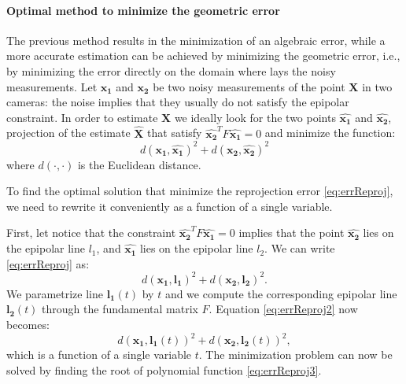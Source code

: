 \paragraph{Optimal method to minimize the geometric error}
The previous method results in the minimization of an algebraic error, while a more accurate estimation can be achieved by minimizing the geometric error, i.e., by minimizing the error directly on the domain where lays the noisy measurements.
Let $\mathbf{x_1}$ and $\mathbf{x_2}$ be two noisy measurements of the point $\mathbf{X}$ in two cameras: the noise implies that they usually do not satisfy the epipolar constraint. In order to estimate $\mathbf{X}$ we ideally look for the two points $\hat{\mathbf{x_1}}$ and $\hat{\mathbf{x_2}}$, projection of the estimate $\hat{\mathbf{X}}$ that satisfy $\hat{\mathbf{x_2}}^{T} F \hat{\mathbf{x_1}} = 0$ and  minimize the function:
\begin{equation}
\label{eq:errReproj}
  d(\mathbf{x_1}, \hat{\mathbf{x_1}})^2 + d(\mathbf{x_2}, \hat{\mathbf{x_2}})^2
\end{equation}
where $d(\cdot,\cdot)$ is the Euclidean distance. 

To find the optimal solution that minimize the reprojection error \eqref{eq:errReproj}, we need to rewrite it conveniently as a function of a single variable.

First, let notice that the constraint $\hat{\mathbf{x_2}}^{T} F \hat{\mathbf{x_1}} = 0$ implies that the point $\hat{\mathbf{x_2}}$ lies on the epipolar line $l_1$, and $\hat{\mathbf{x_1}}$ lies on the epipolar line $l_2$. We can write \eqref{eq:errReproj} as:
\begin{equation}
\label{eq:errReproj2}
  d(\mathbf{x_1}, \mathbf{l_1})^2 + d(\mathbf{x_2}, \mathbf{l_2})^2.
\end{equation}
We parametrize line $\mathbf{l_1}(t)$ by $t$  and we compute the corresponding epipolar line $\mathbf{l_2}(t)$ through the fundamental matrix $F$. Equation \eqref{eq:errReproj2} now becomes:
\begin{equation}
\label{eq:errReproj3}
d(\mathbf{x_1}, \mathbf{l_1}(t))^2 + d(\mathbf{x_2}, \mathbf{l_2}(t))^2,
\end{equation}
which is a function of a single variable $t$. 
The minimization problem can now be solved by finding the root of polynomial function \eqref{eq:errReproj3}.

